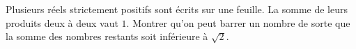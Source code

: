 Plusieurs réels strictement positifs sont écrits sur une feuille. La somme de leurs produits deux à deux vaut $1$. Montrer qu'on peut barrer un nombre de sorte que la somme des nombres restants soit inférieure à $\sqrt{2}$.
